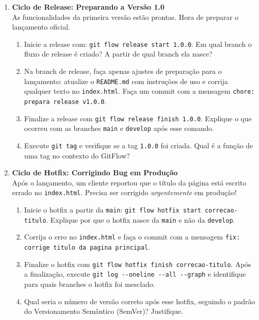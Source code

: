 \documentclass[12pt]{article}
\begin{document}
\begin{enumerate}[label=\textbf{Questão \arabic*:}, leftmargin=1.5cm, labelsep=0.5cm, resume]
    \item \textbf{Ciclo de Release: Preparando a Versão 1.0} \\
    As funcionalidades da primeira versão estão prontas. Hora de preparar o lançamento oficial.
    \begin{enumerate}[label=\alph*)]
        \item Inicie a release com: \texttt{git flow release start 1.0.0}. Em qual branch o fluxo de release é criado? A partir de qual branch ela nasce?
        \item Na branch de release, faça apenas ajustes de preparação para o lançamento: atualize o \texttt{README.md} com instruções de uso e corrija qualquer texto no \texttt{index.html}. Faça um commit com a mensagem \texttt{chore: prepara release v1.0.0}.
        \item Finalize a release com \texttt{git flow release finish 1.0.0}. Explique o que ocorreu com as branches \texttt{main} e \texttt{develop} após esse comando.
        \item Execute \texttt{git tag} e verifique se a tag \texttt{1.0.0} foi criada. Qual é a função de uma tag no contexto do GitFlow?
    \end{enumerate}

    \item \textbf{Ciclo de Hotfix: Corrigindo Bug em Produção} \\
    Após o lançamento, um cliente reportou que o título da página está escrito errado no \texttt{index.html}. Precisa ser corrigido \textit{urgentemente} em produção!
    \begin{enumerate}[label=\alph*)]
        \item Inicie o hotfix a partir da \texttt{main}: \texttt{git flow hotfix start correcao-titulo}. Explique por que o hotfix nasce da \texttt{main} e não da \texttt{develop}.
        \item Corrija o erro no \texttt{index.html} e faça o commit com a mensagem \texttt{fix: corrige titulo da pagina principal}.
        \item Finalize o hotfix com \texttt{git flow hotfix finish correcao-titulo}. Após a finalização, execute \texttt{git log -{-}oneline -{-}all -{-}graph} e identifique para quais branches o hotfix foi mesclado.
        \item Qual seria o número de versão correto após esse hotfix, seguindo o padrão do Versionamento Semântico (SemVer)? Justifique.
    \end{enumerate}


\end{enumerate}
\end{document}

